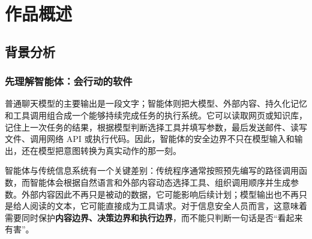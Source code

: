 \section{作品概述}

\subsection{背景分析}

\subsubsection{先理解智能体：会行动的软件}

普通聊天模型的主要输出是一段文字；智能体则把大模型、外部内容、持久化记忆和工具调用组合成一个能够持续完成任务的执行系统。它可以读取网页或知识库，记住上一次任务的结果，根据模型判断选择工具并填写参数，最后发送邮件、读写文件、调用网络 API 或执行代码。因此，智能体的安全边界不只在模型输入和输出，还在模型把意图转换为真实动作的那一刻。

智能体与传统信息系统有一个关键差别：传统程序通常按照预先编写的路径调用函数，而智能体会根据自然语言和外部内容动态选择工具、组织调用顺序并生成参数。外部内容因此不再只是被动的数据，它可能影响后续计划；模型输出也不再只是给人阅读的文本，它可能直接成为工具请求。对于信息安全人员而言，这意味着需要同时保护\textbf{内容边界、决策边界和执行边界}，而不能只判断一句话是否“看起来有害”。

